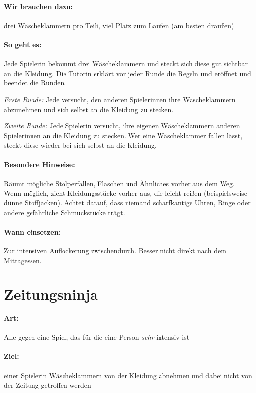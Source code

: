 \paragraph{Wir brauchen dazu:} drei Wäscheklammern pro Teili, viel Platz zum Laufen (am besten draußen)
\paragraph{So geht es:} Jede Spielerin bekommt drei Wäscheklammern und steckt sich diese gut sichtbar an die Kleidung. Die Tutorin erklärt vor jeder Runde die Regeln und eröffnet und beendet die Runden.

\emph{Erste Runde:} Jede versucht, den anderen Spielerinnen ihre Wäscheklammern abzunehmen und sich selbst an die Kleidung zu stecken.

\emph{Zweite Runde:} Jede Spielerin versucht, ihre eigenen Wäscheklammern anderen Spielerinnen an die Kleidung zu stecken. Wer eine Wäscheklammer fallen lässt, steckt diese wieder bei sich selbst an die Kleidung.

\paragraph{Besondere Hinweise:} Räumt mögliche Stolperfallen, Flaschen und Ähnliches vorher aus dem Weg. Wenn möglich, zieht Kleidungsstücke vorher aus, die leicht reißen (beispielsweise dünne Stoffjacken). Achtet darauf, dass niemand scharfkantige Uhren, Ringe oder andere gefährliche Schmuckstücke trägt.
\paragraph{Wann einsetzen:} Zur intensiven Auflockerung zwischendurch. Besser nicht direkt nach dem Mittagessen.

\section{Zeitungsninja}
\paragraph{Art:} Alle-gegen-eine-Spiel, das für die eine Person \emph{sehr} intensiv ist
\paragraph{Ziel:} einer Spielerin  Wäscheklammern von der Kleidung abnehmen und dabei nicht von der Zeitung getroffen werden
